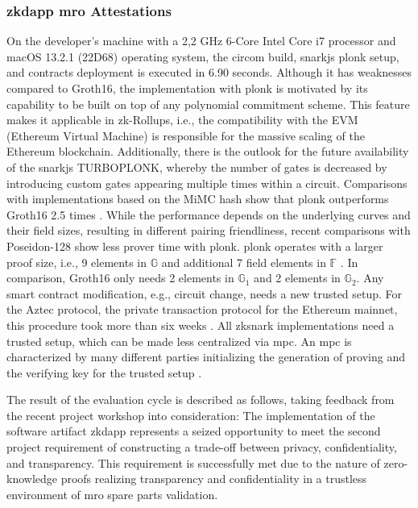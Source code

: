 \subsubsection{\acrshort{zkdapp} \acrshort{mro} Attestations}
On the developer's machine with a 2,2 GHz 6-Core Intel Core i7 processor and macOS 13.2.1 (22D68) operating system, the circom build, snarkjs \acrshort{plonk} setup, and contracts deployment is executed in 6.90 seconds. Although it has weaknesses compared to Groth16, the implementation with \acrshort{plonk} is motivated by its capability to be built on top of any polynomial commitment scheme. This feature makes it applicable in zk-Rollups, i.e., the compatibility with the EVM (Ethereum Virtual Machine) is responsible for the massive scaling of the Ethereum blockchain. Additionally, there is the outlook for the future availability of the snarkjs TURBOPLONK, whereby the number of gates is decreased by introducing custom gates appearing multiple times within a circuit. Comparisons with implementations based on the MiMC hash show that \acrshort{plonk} outperforms Groth16 2.5 times \citep{turboplonk}. While the performance depends on the underlying curves and their field sizes, resulting in different pairing friendliness, recent comparisons with Poseidon-128 show less prover time with \acrshort{plonk}. \acrshort{plonk} operates with a larger proof size, i.e., 9 elements in \begin{math} \mathbb{G}\end{math} and additional 7 field elements in \begin{math} \mathbb{F}\end{math} \citep{PLONKcryptoeprint:2019/953}. In comparison, Groth16 only needs 2 elements in \begin{math} \mathbb{G}_1\end{math} and 2 elements in \begin{math} \mathbb{G}_2\end{math}. Any smart contract modification, e.g., circuit change, needs a new trusted setup. For the Aztec protocol, the private transaction protocol for the Ethereum mainnet, this procedure took more than six weeks \citep{turboplonk}. All \acrshort{zksnark} implementations need a trusted setup, which can be made less centralized via \acrshort{mpc}. An \acrshort{mpc} is characterized by many different parties initializing the generation of proving and the verifying key for the trusted setup \citep{Thaler}. 

The result of the evaluation cycle is described as follows, taking feedback from the recent project workshop into consideration: The implementation of the software artifact \acrshort{zkdapp} represents a seized opportunity to meet the second project requirement of constructing a trade-off between privacy, confidentiality, and transparency. This requirement is successfully met due to the nature of zero-knowledge proofs realizing transparency and confidentiality in a trustless environment of \acrshort{mro} spare parts validation. 

